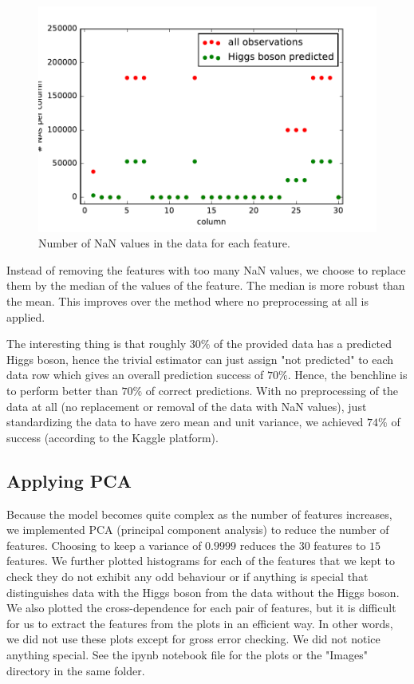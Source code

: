 \documentclass[10pt,conference,compsocconf]{IEEEtran}
\begin{document}
\begin{figure}[tbp]
  \centering
  \includegraphics[width=\columnwidth]{Images/NAPerColumn.pdf}
  \caption{Number of NaN values in the data for each feature.}
  \vspace{-3mm}
  \label{fig:NaNsPerFeatures}
\end{figure}

Instead of removing the features with too many NaN values, we choose to replace them by the median of the values of the feature. The median is more robust than the mean. This improves over the method where no preprocessing at all is applied.

The interesting thing is that roughly $30\%$ of the provided data has a predicted Higgs boson, hence the trivial estimator can just assign "not predicted" to each data row which gives an overall prediction success of $70\%$. Hence, the benchline is to perform better than $70\%$ of correct predictions. With no preprocessing of the data at all (no replacement or removal of the data with NaN values), just standardizing the data to have zero mean and unit variance, we achieved $74\%$ of success (according to the Kaggle platform).

\subsection{Applying PCA}
Because the model becomes quite complex as the number of features increases, we implemented PCA (principal component analysis) to reduce the number of features. Choosing to keep a variance of $0.9999$ reduces the $30$ features to $15$ features. We further plotted histograms for each of the features that we kept to check they do not exhibit any odd behaviour or if anything is special that distinguishes data with the Higgs boson from the data without the Higgs boson. We also plotted the cross-dependence for each pair of features, but it is difficult for us to extract the features from the plots in an efficient way. In other words, we did not use these plots except for gross error checking. We did not notice anything special. See the ipynb notebook file for the plots or the "Images" directory in the same folder.
\end{document}
